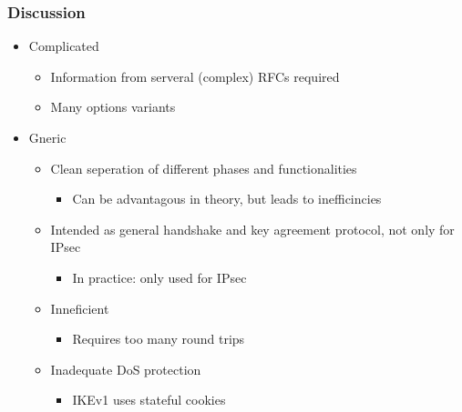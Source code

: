 \subsubsection{Discussion}
\begin{itemize}
  \item Complicated
    \begin{itemize}
      \item Information from serveral (complex) RFCs required
      \item Many options variants
    \end{itemize}
  \item Gneric
    \begin{itemize}
      \item Clean seperation of different phases and functionalities
        \begin{itemize}
          \item Can be advantagous in theory, but leads to inefficincies
        \end{itemize}
      \item Intended as general handshake and key agreement protocol, not only for IPsec
        \begin{itemize}
          \item In practice: only used for IPsec
        \end{itemize}
      \item Inneficient
        \begin{itemize}
          \item Requires too many round trips
        \end{itemize}
      \item Inadequate DoS protection
        \begin{itemize}
          \item IKEv1 uses stateful cookies
        \end{itemize}
    \end{itemize}
\end{itemize}

